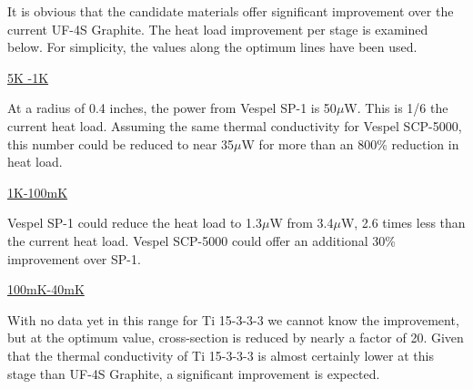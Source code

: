 \documentclass{report}
\begin{document}
\begin{multicols}{2}

It is obvious that the candidate materials offer significant improvement over the current UF-4S Graphite. The heat load improvement per stage is examined below. For simplicity,
the values along the optimum lines have been used.

\smallskip

\large{\underline{5K -1K}}

At a radius of 0.4 inches, the power from Vespel SP-1 is 50$\mu$W. This is 1/6 the current heat load. Assuming the same thermal conductivity for Vespel SCP-5000, this number could
be reduced to near 35$\mu$W for more than an 800\% reduction in heat load.

\smallskip

\underline{{\large 1K-100mK}}

Vespel SP-1 could reduce the heat load to 1.3$\mu$W from 3.4$\mu$W, 2.6 times less than the current heat load. Vespel SCP-5000 could offer an additional 30\% improvement over SP-1.

\smallskip

\underline{{\large 100mK-40mK}}

With no data yet in this range for Ti 15-3-3-3 we cannot know the improvement, but at the optimum value, cross-section is reduced by nearly a factor of 20. Given that the thermal
conductivity of Ti 15-3-3-3 is almost certainly lower at this stage than UF-4S Graphite, a significant improvement is expected.


\end{multicols}
\end{document}
